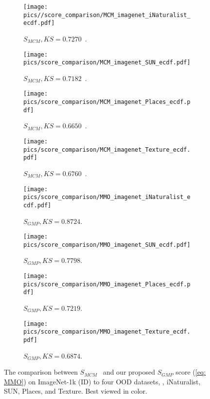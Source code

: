 \begin{figure*}
    \centering
    \begin{subfigure}[t]{0.48\columnwidth}
        \centering
        \texttt{[image: pics//score\_comparison/MCM\_imagenet\_iNaturalist\_ecdf.pdf]}
        \caption{$S_{\textit{MCM}}, \textit{KS}=0.7270$~\cite{ming2022delving}.}
    \end{subfigure}
    \begin{subfigure}[t]{0.48\columnwidth}
        \centering
        \texttt{[image: pics/score\_comparison/MCM\_imagenet\_SUN\_ecdf.pdf]}
        \caption{$S_{\textit{MCM}}, \textit{KS}=0.7182$~\cite{ming2022delving}.}
    \end{subfigure}%
    \begin{subfigure}[t]{0.48\columnwidth}
        \centering
        \texttt{[image: pics/score\_comparison/MCM\_imagenet\_Places\_ecdf.pdf]}
        \caption{$S_{\textit{MCM}}, \textit{KS}=0.6650$~\cite{ming2022delving}.}
    \end{subfigure}%
    \begin{subfigure}[t]{0.48\columnwidth}
        \centering
        \texttt{[image: pics/score\_comparison/MCM\_imagenet\_Texture\_ecdf.pdf]}
        \caption{$S_{\textit{MCM}}, \textit{KS}=0.6760$~\cite{ming2022delving}.}
    \end{subfigure}%
    
    \begin{subfigure}[t]{0.48\columnwidth}
        \centering
        \texttt{[image: pics/score\_comparison/MMO\_imagenet\_iNaturalist\_ecdf.pdf]}
        \caption{$S_{\textit{GMP}}, \textit{KS}=0.8724$.}
    \end{subfigure}
    \begin{subfigure}[t]{0.48\columnwidth}
        \centering
        \texttt{[image: pics/score\_comparison/MMO\_imagenet\_SUN\_ecdf.pdf]}
        \caption{$S_{\textit{GMP}}, \textit{KS}=0.7798$.}
    \end{subfigure}
    \begin{subfigure}[t]{0.48\columnwidth}
        \centering
        \texttt{[image: pics/score\_comparison/MMO\_imagenet\_Places\_ecdf.pdf]}
        \caption{$S_{\textit{GMP}}, \textit{KS}=0.7219$.}
    \end{subfigure}
    \begin{subfigure}[t]{0.48\columnwidth}
        \centering
        \texttt{[image: pics/score\_comparison/MMO\_imagenet\_Texture\_ecdf.pdf]}
        \caption{$S_{\textit{GMP}}, \textit{KS}=0.6874$.}
    \end{subfigure}
    
    \caption{The comparison between $S_{\textit{MCM}}$~\cite{ming2022delving} and our proposed $S_{\textit{GMP}}$ score (\cref{eq: MMO}) on ImageNet-1k (ID) to four OOD datasets, \ie, iNaturalist, SUN, Places, and Texture.
    Best viewed in color.
    }
    \label{fig: ablations: scores full}
\end{figure*}

